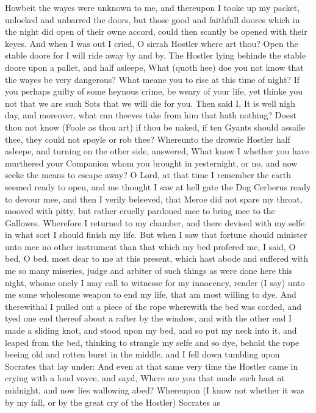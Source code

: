 Howbeit the wayes were unknown to me, and thereupon I tooke up my packet,
unlocked and unbarred the doors, but those good and faithfull doores which in
the night did open of their owne accord, could then scantly be opened with
their keyes. And when I was out I cried, O sirrah Hostler where art thou? Open
the stable doore for I will ride away by and by. The Hostler lying behinde the
stable doore upon a pallet, and half asleepe, What (quoth hee) doe you not know
that the wayes be very dangerous? What meane you to rise at this time of night?
If you perhaps guilty of some heynous crime, be weary of your life, yet thinke
you not that we are such Sots that we will die for you. Then said I, It is well
nigh day, and moreover, what can theeves take from him that hath nothing? Doest
thou not know (Foole as thou art) if thou be naked, if ten Gyants should
assaile thee, they could not spoyle or rob thee? Whereunto the drowsie Hostler
half asleepe, and turning on the other side, answered, What know I whether you
have murthered your Companion whom you brought in yesternight, or no, and now
seeke the means to escape away? O Lord, at that time I remember the earth
seemed ready to open, and me thought I saw at hell gate the Dog Cerberus ready
to devour mee, and then I verily beleeved, that Meroe did not spare my throat,
mooved with pitty, but rather cruelly pardoned mee to bring mee to the
Gallowes. Wherefore I returned to my chamber, and there devised with my selfe
in what sort I should finish my life. But when I saw that fortune should
minister unto mee no other instrument than that which my bed profered me, I
said, O bed, O bed, most dear to me at this present, which hast abode and
suffered with me so many miseries, judge and arbiter of such things as were
done here this night, whome onely I may call to witnesse for my innocency,
render (I say) unto me some wholesome weapon to end my life, that am most
willing to dye. And therewithal I pulled out a piece of the rope wherewith the
bed was corded, and tyed one end thereof about a rafter by the window, and with
the other end I made a sliding knot, and stood upon my bed, and so put my neck
into it, and leaped from the bed, thinking to strangle my selfe and so dye,
behold the rope beeing old and rotten burst in the middle, and I fell down
tumbling upon Socrates that lay under: And even at that same very time the
Hostler came in crying with a loud voyce, and sayd, Where are you that made
such hast at midnight, and now lies wallowing abed? Whereupon (I know not
whether it was by my fall, or by the great cry of the Hostler) Socrates as
